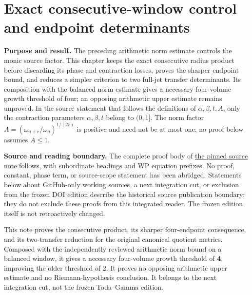 \section{Exact consecutive-window control and endpoint determinants}\label{window-product-exact-consecutive-window-control-and-endpoint-determinants}

\textbf{Purpose and result.}
The preceding arithmetic norm estimate controls the monic source factor. This chapter keeps the exact consecutive radius product before discarding its phase and contraction losses, proves the sharper endpoint bound, and reduces a simpler criterion to two full-jet transfer determinants. Its composition with the balanced norm estimate gives a necessary four-volume growth threshold of four; an opposing arithmetic upper estimate remains unproved. In the source statement that follows the definitions of \(\alpha,\beta,t,A\), only the contraction parameters \(\alpha,\beta,t\) belong to \((0,1]\). The norm factor \(A=(\omega_{n+r}/\omega_n)^{1/(2r)}\) is positive and need not be at most one; no proof below assumes \(A\le1\).

\textbf{Source and reading boundary.}
The complete proof body of \href{https://github.com/KokunoYumeto/zeta-function-research-reader/blob/952ef9fee1e1419b6858d920354de8fa99430b7d/workbenches/tau-arithmetic-endpoint-bounds/window/WINDOW_PRODUCT_PROOF.md}{the pinned source note} follows, with subordinate headings and WP equation prefixes. No proof, constant, phase term, or source-scope statement has been abridged. Statements below about GitHub-only working sources, a next integration cut, or exclusion from the frozen DOI edition describe the historical source publication boundary; they do not exclude these proofs from this integrated reader. The frozen edition itself is not retroactively changed.

\begingroup
\setlength{\emergencystretch}{3em}
\providecommand{\tightlist}{\setlength{\itemsep}{0pt}\setlength{\parskip}{0pt}}

This note proves the consecutive product, its sharper four-endpoint consequence, and its two-transfer reduction for the original canonical quotient metrics. Composed with the independently reviewed arithmetic norm bound on a balanced window, it gives a necessary four-volume growth threshold of \textbf{4}, improving the older threshold of 2. It proves no opposing arithmetic upper estimate and no Riemann-hypothesis conclusion. It belongs to the next integration cut, not the frozen Toda--Gamma edition.

